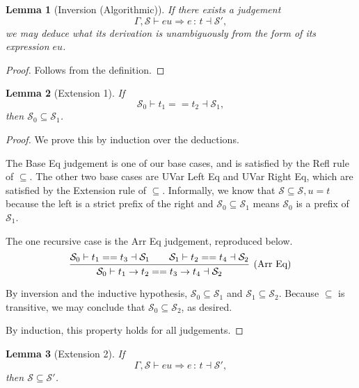 \documentclass{article}
\newtheorem{lemma}{Lemma}
\newcommand{\G}{\Gamma}
\newcommand{\St}{\mathcal{S}}
\newcommand{\tp}{t}
\newcommand{\uv}{u}
\newcommand{\eu}{eu}
\newcommand{\e}{e}
\newcommand{\spc}{\qquad}
\newcommand{\eq}{==}
\renewcommand{\implies}{\Rightarrow}
\newcommand{\withtp}[2]{{#1} \,:\, {#2}}
\newcommand{\arr}[2]{{#1} \to {#2}}
\newcommand{\algtp}[6]{#1, #2 \vdash #3 \implies {\withtp {#4} {#5}} \dashv #6}
\newcommand{\equals}[4]{{#1} \vdash {#2} \eq {#3} \dashv {#4}}
\newcommand{\deduct}[3][]
{
  \begin{prooftree}
    \hypo{#2}
    \infer1[\text{#1}]{#3}
  \end{prooftree}
}
\begin{document}
\begin{lemma}[Inversion (Algorithmic)]
  If there exists a judgement
  \[ \algtp \G \St \eu \e \tp \St',\]
  we may deduce what its derivation is unambiguously from the form of
  its expression \(\eu\).
\end{lemma}

\begin{proof}
  Follows from the definition.
\end{proof}

\begin{lemma}[Extension 1]
  If
  \[ \equals {\St_0} {\tp_1} {\tp_2} {\St_1}, \]
  then \(\St_0 \subseteq \St_1\).
\end{lemma}

\begin{proof}
  We prove this by induction over the deductions.

  The Base Eq judgement is one of our base cases, and is satisfied by the Refl
  rule of \(\subseteq\). The other two base cases are UVar Left Eq and UVar
  Right Eq, which are satisfied by the Extension rule of \(\subseteq\).
  Informally, we know that \(\St \subseteq \St, \uv = \tp\) because the left is
  a strict prefix of the right and \(\St_0 \subseteq \St_1\) means \(\St_0\) is
  a prefix of \(\St_1\).

  The one recursive case is the Arr Eq judgement, reproduced below.
  \[
  \deduct
  {\equals {\St_0} {\tp_1} {\tp_3} {\St_1} \spc
   \equals {\St_1} {\tp_2} {\tp_4} {\St_2}}
  {\equals {\St_0} {\arr {\tp_1} {\tp_2}} {\arr {\tp_3} {\tp_4}} {\St_2}}
  {\text{(Arr Eq)}}
  \]

  By inversion and the inductive hypothesis, \(\St_0 \subseteq \St_1\) and
  \(\St_1 \subseteq \St_2\). Because \(\subseteq\) is transitive, we may
  conclude that \(\St_0 \subseteq \St_2\), as desired.

  By induction, this property holds for all judgements.
\end{proof}

\begin{lemma}[Extension 2]
  If
  \[ \algtp \G \St \eu \e \tp \St', \]
  then \(\St \subseteq \St'\).
\end{lemma}
\end{document}
